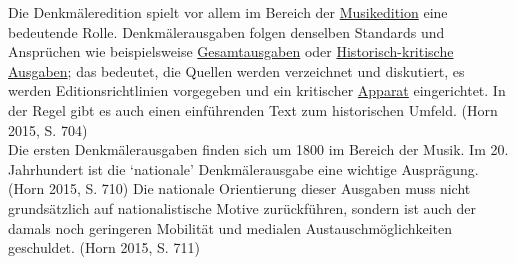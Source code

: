 \documentclass{article}
\begin{document}
        Die Denkmäleredition spielt vor allem im Bereich der \href{http://gams.uni-graz.at/o:konde.139}{Musikedition} eine bedeutende Rolle.
                  Denkmälerausgaben folgen denselben Standards und Ansprüchen wie beispielsweise
                     \href{http://gams.uni-graz.at/o:konde.91}{Gesamtausgaben} oder \href{http://gams.uni-graz.at/o:konde.93}{Historisch-kritische Ausgaben}; das
                  bedeutet, die Quellen werden verzeichnet und diskutiert, es werden
                  Editionsrichtlinien vorgegeben und ein kritischer \href{http://gams.uni-graz.at/o:konde.32}{Apparat} eingerichtet. In der Regel gibt es auch
                  einen einführenden Text zum historischen Umfeld. (Horn 2015, S. 704)\\
            
        Die ersten Denkmälerausgaben finden sich um 1800 im Bereich der Musik. Im 20.
                  Jahrhundert ist die ‘nationale’ Denkmälerausgabe eine wichtige Ausprägung.
                  (Horn 2015, S. 710) Die nationale Orientierung dieser Ausgaben muss
                  nicht grundsätzlich auf nationalistische Motive zurückführen, sondern ist auch der
                  damals noch geringeren Mobilität und medialen Austauschmöglichkeiten geschuldet.
                     (Horn 2015, S. 711)\\
            
\end{document}
